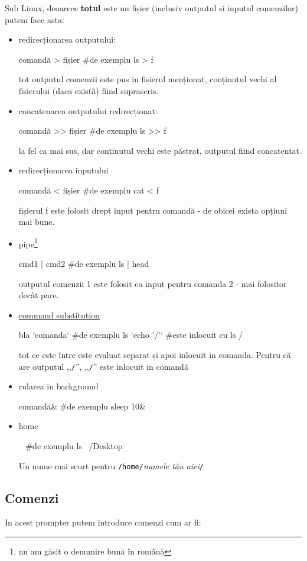 \documentclass[11pt,a4paper]{article}
\begin{document}
Sub Linux, deoarece \textbf{totul} este un fișier (inclusiv outputul si inputul comenzilor) putem face asta:
\begin{itemize}
\item redirecționarea outputului:
\begin{bash}
comandă > fișier
#de exemplu
ls > f 
\end{bash}
tot outputul comenzii este pus in fișierul menționat, conținutul vechi al fișierului (daca există) fiind suprascris.
\item concatenarea outputului redirecționat:
\begin{bash}
comandă >> fișier
#de exemplu
ls >> f 
\end{bash}
la fel ca mai sus, dar conținutul vechi este păstrat, outputul fiind concatentat.
\item redirecționarea inputului
\begin{bash}
comandă < fișier
#de exemplu
cat < f 
\end{bash}
fișierul f este folosit drept input pentru comandă - de obicei exista opțiuni mai bune.

\item pipe\footnote{nu am găsit o denumire bună în română}
\begin{bash}
cmd1 | cmd2
#de exemplu
ls | head
\end{bash}

outputul comenzii 1 este folosit ca input pentru comanda 2 - mai folositor decât pare.

\item \href{https://unix.stackexchange.com/questions/48392/understanding-backtick}{command substitution}
\begin{bash}
bla `comanda`
#de exemplu
ls `echo '/'`
#este inlocuit cu
ls /
\end{bash}
tot ce este între  este evaluat separat și apoi inlocuit in comanda.
Pentru că  are outputul ,,\texttt{/}'', ,,\texttt{/}'' este inlocuit in comandă
\item rularea in background
\begin{bash}
comandă&
#de exemplu
sleep 10&
\end{bash}
\item home
\begin{bash}
~
#de exemplu
ls ~/Desktop
\end{bash}
Un nume mai scurt pentru \texttt{/home/}\textit{numele tău aici}\texttt{/}
\end{itemize}

\subsection*{Comenzi}
In acest prompter putem introduce comenzi cum ar fi:
\end{document}

